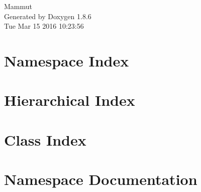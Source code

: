 \documentclass[twoside]{book}
\newcommand{\clearemptydoublepage}{%
  \newpage{\pagestyle{empty}\cleardoublepage}%
}
\begin{document}
\hypersetup{pageanchor=false}
\begin{titlepage}
\vspace*{7cm}
\begin{center}%
{\Large Mammut }\\
\vspace*{1cm}
{\large Generated by Doxygen 1.8.6}\\
\vspace*{0.5cm}
{\small Tue Mar 15 2016 10:23:56}\\
\end{center}
\end{titlepage}
\clearemptydoublepage
\tableofcontents
\clearemptydoublepage
{}
\hypersetup{pageanchor=true}

\chapter{Namespace Index}

\chapter{Hierarchical Index}

\chapter{Class Index}

\chapter{Namespace Documentation}

\end{document}
